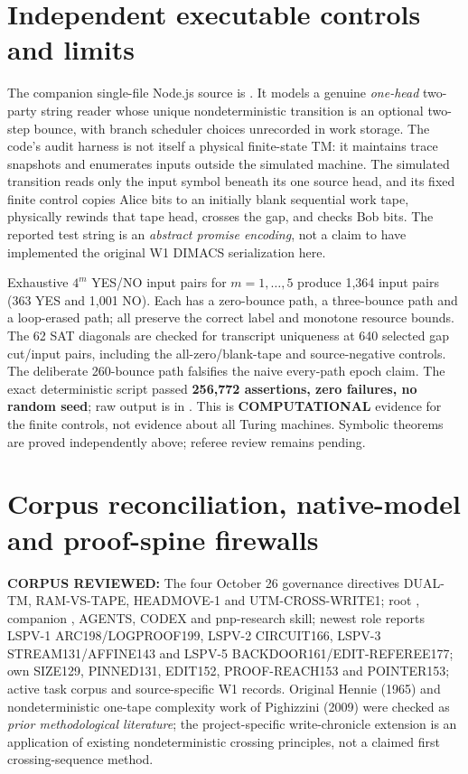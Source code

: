\documentclass[11pt]{article}
\begin{document}
\section{Independent executable controls and limits}
The companion single-file Node.js source is
.
It models a genuine \emph{one-head} two-party string reader whose unique nondeterministic transition is an optional two-step bounce, with branch scheduler choices unrecorded in work storage. The code's audit harness is not itself a physical finite-state TM: it maintains trace snapshots and enumerates inputs outside the simulated machine. The simulated transition reads only the input symbol beneath its one source head, and its fixed finite control copies Alice bits to an initially blank sequential work tape, physically rewinds that tape head, crosses the gap, and checks Bob bits. The reported test string is an \emph{abstract promise encoding}, not a claim to have implemented the original W1 DIMACS serialization here.

Exhaustive $4^m$ YES/NO input pairs for $m=1,\ldots,5$ produce 1,364 input pairs (363 YES and 1,001 NO). Each has a zero-bounce path, a three-bounce path and a loop-erased path; all preserve the correct label and monotone resource bounds. The 62 SAT diagonals are checked for transcript uniqueness at 640 selected gap cut/input pairs, including the all-zero/blank-tape and source-negative controls. The deliberate 260-bounce path falsifies the naive every-path epoch claim. The exact deterministic script passed \textbf{256,772 assertions, zero failures, no random seed}; raw output is in
.
This is \textbf{COMPUTATIONAL} evidence for the finite controls, not evidence about all Turing machines. Symbolic theorems are proved independently above; referee review remains pending.

\section{Corpus reconciliation, native-model and proof-spine firewalls}
\textbf{CORPUS REVIEWED:} The four October 26 governance directives DUAL-TM, RAM-VS-TAPE, HEADMOVE-1 and UTM-CROSS-WRITE1; root , companion , AGENTS, CODEX and pnp-research skill; newest role reports LSPV-1 ARC198/LOGPROOF199, LSPV-2 CIRCUIT166, LSPV-3 STREAM131/AFFINE143 and LSPV-5 BACKDOOR161/EDIT-REFEREE177; own SIZE129, PINNED131, EDIT152, PROOF-REACH153 and POINTER153; active task corpus and source-specific W1 records. Original Hennie (1965) and nondeterministic one-tape complexity work of Pighizzini (2009) were checked as \emph{prior methodological literature}; the project-specific write-chronicle extension is an application of existing nondeterministic crossing principles, not a claimed first crossing-sequence method.
\end{document}
